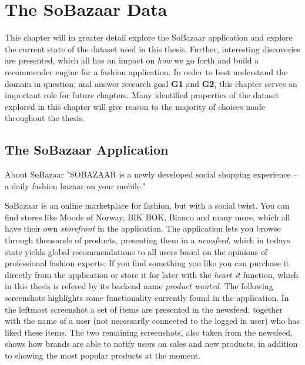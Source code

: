 
\chapter{The SoBazaar Data}
\label{chap:thesobazaardata}
\minitoc

This chapter will in greater detail explore the SoBazaar application and
explore the current state of the dataset used in this thesis. Further,
interesting discoveries are presented, which all has an impact on \textit{how}
we go forth and build a recommender engine for a fashion application. In order
to best understand the domain in question, and answer research goal \textbf{G1}
and \textbf{G2}, this chapter serves an important role for future chapters.
Many identified properties of the dataset explored in this chapter will give
reason to the majority of choices made throughout the thesis.

\clearpage
\section{The SoBazaar Application}
\label{sec:sobazaar-application}


\begin{chapquote}[30pt]{About SoBazaar}
  "SOBAZAAR is a newly developed social shopping experience -- a daily fashion bazaar on your mobile."
\end{chapquote}

SoBazaar is an online marketplace for fashion, but with a social twist. You can
find stores like Moods of Norway, BIK BOK, Bianco and many more, which all have
their own \textit{storefront} in the application. The application lets you
browse through thousands of products, presenting them in a \textit{newsfeed},
which in todays state yields global recommendations to all users based on the
opinions of professional fashion experts. If you find something you like you
can purchase it directly from the application or store it for later with the
\emph{heart it} function, which in this thesis is refered by its backend name
\textit{product wanted}. The following screenshots highlights some
functionality currently found in the application. In the leftmost screenshot a
set of items are presented in the newsfeed, together with the name of a user
(not necessarily connected to the logged in user) who has liked these items.
The two remaining screenshots, also taken from the newsfeed, shows how brands
are able to notify users on sales and new products, in addition to showing the
most popular products at the moment.

